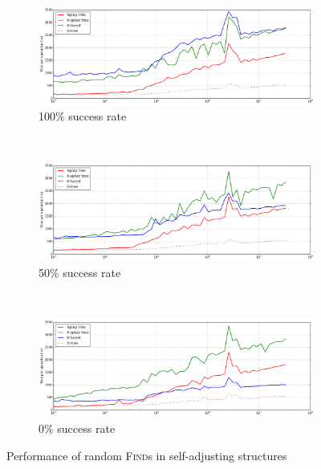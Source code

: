 \begin{figure}
\begin{subfigure}[t]{\textwidth}
	\includegraphics[width=\textwidth]{img/performance/self-adj-random-find-100}
	\caption{100\% success rate}
\end{subfigure}
\\
\begin{subfigure}[t]{\textwidth}
	\includegraphics[width=\textwidth]{img/performance/self-adj-random-find-50}
	\caption{50\% success rate}
\end{subfigure}
\\
\begin{subfigure}[t]{\textwidth}
	\includegraphics[width=\textwidth]{img/performance/self-adj-random-find-0}
	\caption{0\% success rate}
\end{subfigure}
\caption{Performance of random \textsc{Find}s in self-adjusting structures}
\label{fig:self-adj-performance-finds}
\end{figure}

